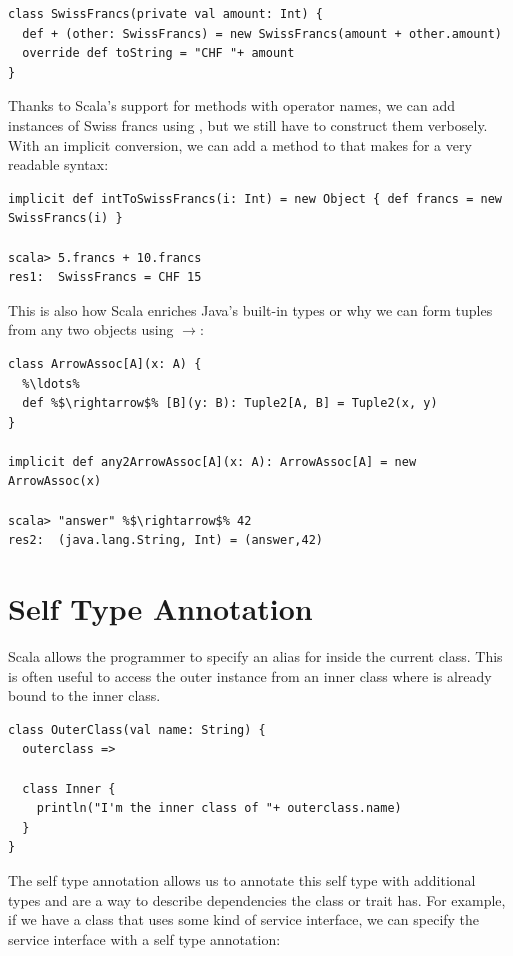 \documentclass[10pt,a4paper,oneside]{scrreprt}
\begin{document}
\begin{lstlisting}
class SwissFrancs(private val amount: Int) {
  def + (other: SwissFrancs) = new SwissFrancs(amount + other.amount)
  override def toString = "CHF "+ amount
}
\end{lstlisting}

Thanks to Scala's support for methods with operator names, we can add instances of Swiss francs using \src{+}, but we still have to construct them verbosely. With an implicit conversion, we can add a  method to  that makes for a very readable syntax:

\begin{lstlisting}
implicit def intToSwissFrancs(i: Int) = new Object { def francs = new SwissFrancs(i) }

scala> 5.francs + 10.francs
res1:  SwissFrancs = CHF 15
\end{lstlisting}

This is also how Scala enriches Java's built-in types or why we can form tuples from any two objects using $\rightarrow$:

\begin{lstlisting}
class ArrowAssoc[A](x: A) {
  %\ldots%
  def %$\rightarrow$% [B](y: B): Tuple2[A, B] = Tuple2(x, y)
}

implicit def any2ArrowAssoc[A](x: A): ArrowAssoc[A] = new ArrowAssoc(x)

scala> "answer" %$\rightarrow$% 42
res2:  (java.lang.String, Int) = (answer,42)
\end{lstlisting}

\section{Self Type Annotation} \label{section:self-type-annotation}

Scala allows the programmer to specify an alias for  inside the current class. This is often useful to access the outer instance from an inner class where  is already bound to the inner class. 

\begin{lstlisting}
class OuterClass(val name: String) {
  outerclass =>

  class Inner {
    println("I'm the inner class of "+ outerclass.name)
  }
}
\end{lstlisting}

The self type annotation allows us to annotate this self type with additional types and are a way to describe dependencies the class or trait has. For example, if we have a class that uses some kind of service interface, we can specify the service interface with a self type annotation:
\end{document}
